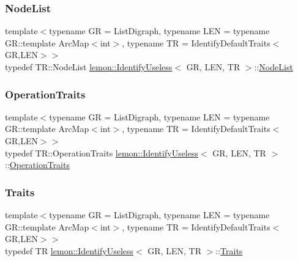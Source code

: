 \mbox{\label{classlemon_1_1_identify_useless_a9de719ca7cb13d499ff99c728d4ec16e}} 
\subsubsection{\texorpdfstring{Node\+List}{NodeList}}
{\footnotesize\ttfamily template$<$typename GR  = List\+Digraph, typename L\+EN  = typename G\+R\+::template Arc\+Map$<$int$>$, typename TR  = Identify\+Default\+Traits$<$\+G\+R,\+L\+E\+N$>$$>$ \\
typedef T\+R\+::\+Node\+List \hyperlink{classlemon_1_1_identify_useless}{lemon\+::\+Identify\+Useless}$<$ GR, L\+EN, TR $>$\+::\hyperlink{classlemon_1_1_identify_useless_a9de719ca7cb13d499ff99c728d4ec16e}{Node\+List}}

\mbox{\label{classlemon_1_1_identify_useless_ad9bc590b20f0a2dc6f9bd28eea1f6ba4}} 
\subsubsection{\texorpdfstring{Operation\+Traits}{OperationTraits}}
{\footnotesize\ttfamily template$<$typename GR  = List\+Digraph, typename L\+EN  = typename G\+R\+::template Arc\+Map$<$int$>$, typename TR  = Identify\+Default\+Traits$<$\+G\+R,\+L\+E\+N$>$$>$ \\
typedef T\+R\+::\+Operation\+Traits \hyperlink{classlemon_1_1_identify_useless}{lemon\+::\+Identify\+Useless}$<$ GR, L\+EN, TR $>$\+::\hyperlink{classlemon_1_1_identify_useless_ad9bc590b20f0a2dc6f9bd28eea1f6ba4}{Operation\+Traits}}

\mbox{\label{classlemon_1_1_identify_useless_a966f0494a37669191b1ce31fc9362e91}} 
\subsubsection{\texorpdfstring{Traits}{Traits}}
{\footnotesize\ttfamily template$<$typename GR  = List\+Digraph, typename L\+EN  = typename G\+R\+::template Arc\+Map$<$int$>$, typename TR  = Identify\+Default\+Traits$<$\+G\+R,\+L\+E\+N$>$$>$ \\
typedef TR \hyperlink{classlemon_1_1_identify_useless}{lemon\+::\+Identify\+Useless}$<$ GR, L\+EN, TR $>$\+::\hyperlink{classlemon_1_1_identify_useless_a966f0494a37669191b1ce31fc9362e91}{Traits}}

